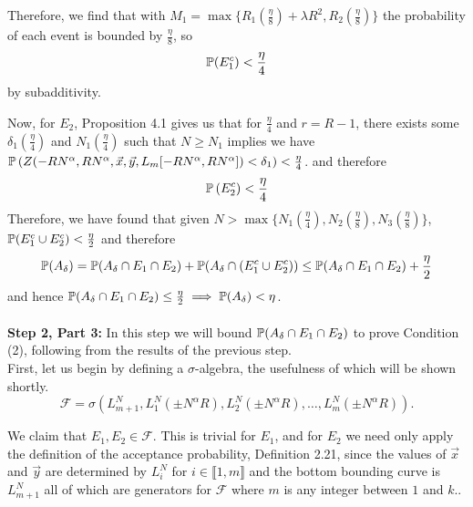 	Therefore, we find that with $M_1=\max\{R_1(\frac{\eta}{8})+\lambda R^2,R_2(\frac\eta8)\}$ the probability of each event is bounded by $\frac{\eta}8$, so $$\mathbb{P}(E_1^c)<\frac{\eta}{4}$$ by subadditivity.
	
	Now, for $E_2$, Proposition 4.1 gives us that for $\frac{\eta}{4}$ and $r=R-1$, there exists some $\delta_1(\frac\eta 4)$ and $N_1(\frac{\eta}{4})$ such that $N\geq N_1$ implies we have  $\mathbb{P}\left(Z(-RN^\alpha, RN^\alpha, \vec x, \vec y, L_m[-RN^\alpha,RN^\alpha])<\delta_1\right)<\frac{\eta}{4}$. and therefore \[
	\mathbb{P}\left( E_2^c\right)<\frac{\eta}{4}
	\]
	Therefore, we have found that given $N>\max\{N_1(\frac{\eta}{4}),N_2(\frac{\eta}{8}),N_3(\frac{\eta}{8})\}$, $\mathbb{P}(E_1^c\cup E_2^c)<\frac{\eta}{2}$ and therefore $$\mathbb{P}(A_\delta)= \mathbb{P}(A_\delta\cap E_1\cap E_2)+\mathbb{P}(A_\delta\cap\left(E_1^c\cup E_2^c\right))\leq \mathbb{P}(A_\delta\cap E_1\cap E_2)+\frac{\eta}{2}$$ and hence $\mathbb{P}(A_\delta\cap E_1\cap E_2)\leq \frac{\eta}{2}\implies \mathbb{P}(A_\delta)<\eta$.\\\\\noindent
	\textbf{Step 2, Part 3:} In this step we will bound $\mathbb{P}(A_\delta\cap E_1\cap E_2)$ to prove Condition (2), following from the results of the previous step.\\
	First, let us begin by defining a $\sigma$-algebra, the usefulness of which will be shown shortly. 
	$$\mathcal{F}=\sigma\left(L_{m+1}^N,L_1^N(\pm N^\alpha R), L_2^N(\pm N^\alpha R),\dots, L_m^N(\pm N^\alpha R)\right).$$
	
	We claim that $E_1, E_2\in \mathcal{F}$. This is trivial for $E_1$, and for $E_2$ we need only apply the definition of the acceptance probability, Definition 2.21, since the values of $\vec x$ and $\vec y$ are determined by $L_i^N$ for $i\in \llbracket 1,m\rrbracket$ and the bottom bounding curve is $L_{m+1}^N$ all of which are generators for $\mathcal{F}$ where $m$ is any integer between $1$ and $k$..
	
